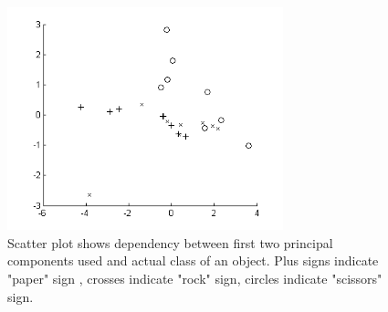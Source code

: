 
\begin{figure}
\begin{center}
\includegraphics[width=80mm]{paclassplot.png}
\caption{Scatter plot shows dependency between first two principal components used and actual class of an object. Plus signs indicate "paper" sign , crosses indicate "rock" sign, circles indicate "scissors" sign. }
\label{fig:paclassplot}
\end{center}
\end{figure}
